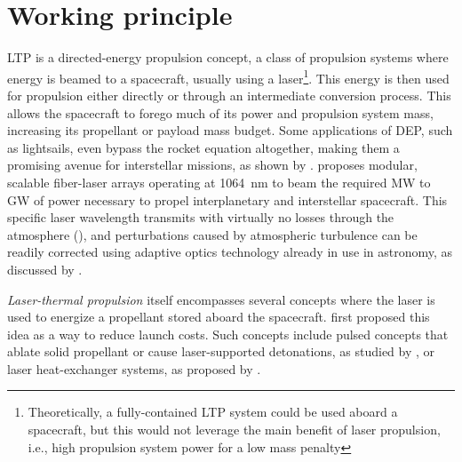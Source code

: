     \section{Working principle} \label{sec:background_principle}
        LTP is a directed-energy propulsion concept, a class of propulsion systems where energy is beamed to a spacecraft, usually using a laser\footnote{Theoretically, a fully-contained LTP system could be used aboard a spacecraft, but this would not leverage the main benefit of laser propulsion, i.e., high propulsion system power for a low mass penalty}. This energy is then used for propulsion either directly or through an intermediate conversion process. This allows the spacecraft to forego much of its power and propulsion system mass, increasing its propellant or payload mass budget. Some applications of DEP, such as lightsails, even bypass the rocket equation altogether, making them a promising avenue for interstellar missions, as shown by \textcite{lubinRoadmapInterstellarFlight2016a}. \citeauthor{lubinRoadmapInterstellarFlight2016a} proposes modular, scalable fiber-laser arrays operating at \qty{1064}{nm} to beam the required MW to GW of power necessary to propel interplanetary and interstellar spacecraft. This specific laser wavelength transmits with virtually no losses through the atmosphere (\textcite{geminiobservatorySites2020}), and perturbations caused by atmospheric turbulence can be readily corrected using adaptive optics technology already in use in astronomy, as discussed by \textcite{eckelLaserPropulsionSystems2008, hettelBeamPropagationSimulation2021}. 

        \emph{Laser-thermal propulsion} itself encompasses several concepts where the laser is used to energize a propellant stored aboard the spacecraft. \textcite{kantrowitzRelevanceSpace1971} first proposed this idea as a way to reduce launch costs. Such concepts include pulsed concepts that ablate solid propellant or cause laser-supported detonations, as studied by \textcite{myraboPowerBeamingTechnologyLaser1984}, or laser heat-exchanger systems, as proposed by \textcite{kareLaserpoweredHeatExchanger1995}. 
        
